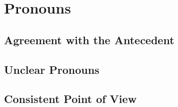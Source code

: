\section{Pronouns}
\subsection{Agreement with the Antecedent}
\subsection{Unclear Pronouns}
\subsection{Consistent Point of View}